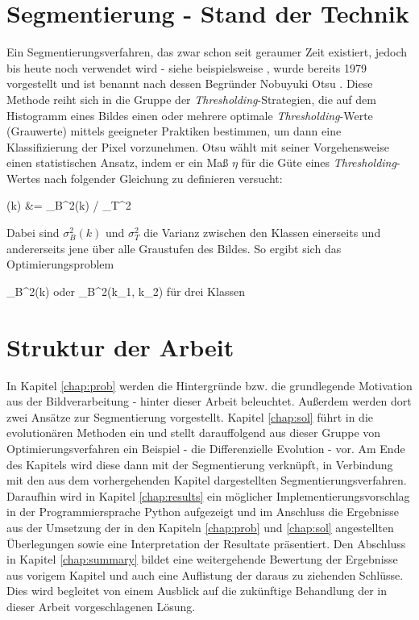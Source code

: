 	\section{Segmentierung - Stand der Technik}
	\label{sec:state-of-the-art}
		Ein Segmentierungsverfahren, das zwar schon seit geraumer Zeit existiert, jedoch bis heute noch verwendet wird - siehe beispielsweise \cite[S. 5]{chinese-method}, wurde bereits 1979 vorgestellt und ist benannt nach dessen Begründer Nobuyuki Otsu \cite{otsu}. Diese Methode reiht sich in die Gruppe der \textit{Thresholding}-Strategien, die auf dem Histogramm eines Bildes einen oder mehrere optimale \textit{Thresholding}-Werte (Grauwerte) mittels geeigneter Praktiken bestimmen, um dann eine Klassifizierung der Pixel vorzunehmen. Otsu wählt mit seiner Vorgehensweise einen statistischen Ansatz, indem er ein Maß $\eta$ für die Güte eines \textit{Thresholding}-Wertes nach folgender Gleichung zu definieren versucht:
		\begin{flalign}
			\centering
			\eta(k) &= \sigma_{B}^{2}(k) / \sigma_{T}^{2} \label{eq:thresh-good}
		\end{flalign}
		Dabei sind $\sigma_{B}^{2}(k)$ und $\sigma_{T}^{2}$ die Varianz zwischen den Klassen einerseits und andererseits jene über alle Graustufen des Bildes. So ergibt sich das Optimierungsproblem
		\begin{flalign}
			\centering
			 \sigma_{B}^{2}(k) \quad \textrm{oder} \quad {} \sigma_{B}^{2}(k_{1}, k_{2}) \quad \textrm{für drei Klassen}\label{eq:otsu-best-threshold}
		\end{flalign}
	
	\section{Struktur der Arbeit}
	\label{sec:structure}
		In Kapitel \ref{chap:prob} werden die Hintergründe bzw. die grundlegende 
		Motivation aus der Bildverarbeitung - hinter dieser Arbeit beleuchtet. Außerdem werden dort zwei Ansätze zur Segmentierung vorgestellt.
		Kapitel \ref{chap:sol} führt in die evolutionären Methoden ein und stellt darauffolgend aus dieser Gruppe von Optimierungsverfahren ein Beispiel - die Differenzielle Evolution - vor. Am Ende des Kapitels wird diese dann mit der Segmentierung verknüpft, in Verbindung mit den aus dem vorhergehenden Kapitel dargestellten Segmentierungsverfahren.
		Daraufhin wird in Kapitel \ref{chap:results} ein möglicher Implementierungsvorschlag in der Programmiersprache Python aufgezeigt und im Anschluss die Ergebnisse aus der Umsetzung der in den Kapiteln \ref{chap:prob} und \ref{chap:sol} angestellten Überlegungen sowie eine Interpretation der Resultate präsentiert.
		Den Abschluss in Kapitel \ref{chap:summary} bildet eine weitergehende Bewertung der Ergebnisse aus vorigem Kapitel und auch eine Auflistung der daraus zu ziehenden Schlüsse. Dies wird begleitet von einem Ausblick auf die zukünftige Behandlung der in dieser Arbeit vorgeschlagenen Lösung.
